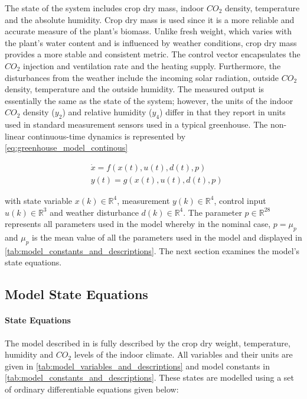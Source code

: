 The state of the system includes crop dry mass, indoor $CO_2$ density, temperature and the absolute humidity. Crop dry mass is used since it is a more reliable and accurate measure of the plant's biomass. Unlike fresh weight, which varies with the plant's water content and is influenced by weather conditions, crop dry mass provides a more stable and consistent metric. The control vector encapsulates the $CO_2$ injection and ventilation rate and the heating supply. Furthermore, the disturbances from the weather include the incoming solar radiation, outside $CO_2$ density, temperature and the outside humidity. The measured output is essentially the same as the state of the system; however, the units of the indoor $CO_2$ density ($y_2$) and relative humidity ($y_4$) differ in that they report in units used in standard measurement sensors used in a typical greenhouse. The non-linear continuous-time dynamics is represented by \autoref{eq:greenhouse_model_continous}

\begin{equation}\label{eq:greenhouse_model_continous}
	\begin{aligned}
		& \dot{x}= f(x(t),u(t),d(t),p) \\
		& y(t) = g(x(t),u(t),d(t),p)
	\end{aligned}
\end{equation}

with state variable $x(k) \in \mathbb{R}^4$, measurement $y(k) \in \mathbb{R}^4$, control input $u(k) \in \mathbb{R}^3$ and weather disturbance $d(k) \in \mathbb{R}^4$. The parameter $p \in \mathbb{R}^{28}$ represents all parameters used in the model whereby in the nominal case, $p=\mu_p$ and $\mu_p$ is the mean value of all the parameters used in the model and displayed in \autoref{tab:model_constants_and_descriptions}. The next section examines the model's state equations.

\subsection {Model State Equations}

\paragraph{State Equations}
The model described in \cite{hentenGreenhouseClimateManagement1994} is fully described by the crop dry weight, temperature, humidity and $CO_2$ levels of the indoor climate. All variables and their units are given in \autoref{tab:model_variables_and_descriptions} and model constants in
\autoref{tab:model_constants_and_descriptions}. These states are modelled using a set of ordinary differentiable equations given below:

